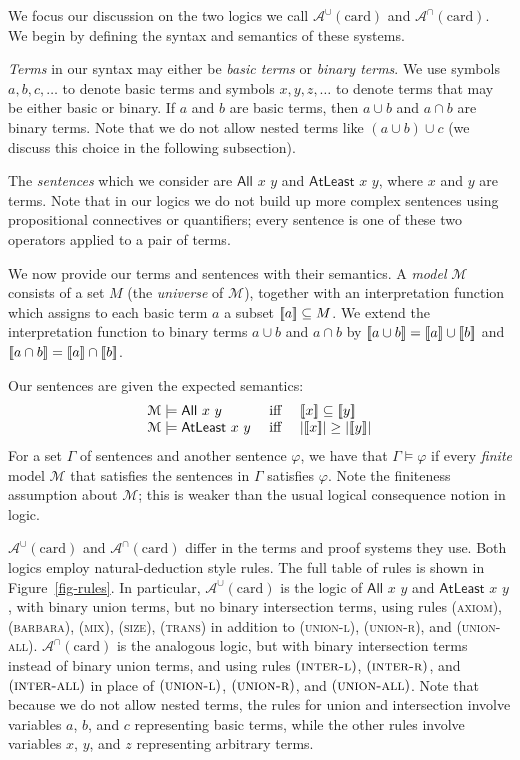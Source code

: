 \documentclass[letterpaper]{article} %
\theoremstyle{definition}
\newcommand{\semantics}[1]{[\![\mbox{\em $ #1 $\/}]\!]}
\newcommand{\Model}{\mathcal{M}}
\newcommand{\Aunion}{\mathscr{A}^{\cup}}
\newcommand{\Ainter}{\mathscr{A}^{\cap}}
\newcommand{\proverule}{\textsc}
\newcommand{\axiom}{\proverule{axiom}}
\newcommand{\barbara}{\proverule{barbara}}
\newcommand{\unionl}{\proverule{union-l}}
\newcommand{\unionr}{\proverule{union-r}}
\newcommand{\unionall}{\proverule{union-all}}
\newcommand{\interl}{\proverule{inter-l}}
\newcommand{\interr}{\proverule{inter-r}}
\newcommand{\interall}{\proverule{inter-all}}
\newcommand{\mix}{\proverule{mix}}
\newcommand{\size}{\proverule{size}}
\newcommand{\trans}{\proverule{trans}}
\newcommand{\All}[2]{\mathsf{All}\,\,#1\,\,#2}
\newcommand{\Atleast}[2]{\mathsf{AtLeast}\,\,#1\,\,#2}
\newcommand{\card}{\mathrm{card}}
\begin{document}
We focus our discussion on the two logics we call $\Aunion(\card)$ and $\Ainter(\card)$. We begin by defining the syntax and semantics of these systems.

\emph{Terms} in our syntax may either be \emph{basic terms} or \emph{binary terms}.  We use symbols $a, b, c, \ldots$ to denote basic terms and symbols $x, y, z, \ldots$ to denote terms that may be either basic or binary. If $a$ and $b$ are basic terms, then $a \cup b$ and $a \cap b$ are binary terms. Note that we do not allow nested terms like $(a\cup b)\cup c$ (we discuss this choice in the following subsection). 

The \emph{sentences} which we consider are $\All{x}{y}$ and $\Atleast{x}{y}$, where $x$ and $y$ are terms.
Note that in our logics we do not build up more complex sentences using propositional connectives or quantifiers; every sentence is one of these two operators applied to a pair of terms.

We now provide our terms and sentences with their semantics.  A \emph{model} $\mathcal{M}$ consists of a set $M$ (the \emph{universe} of $\mathcal{M}$), together with an interpretation function which assigns to each basic term $a$ a subset $\semantics{a} \subseteq M$.  We extend the interpretation function to binary terms $a \cup b$ and $a \cap b$ by $\semantics{a \cup b} = \semantics{a} \cup \semantics{b}$ and $\semantics{a \cap b} = \semantics{a} \cap \semantics{b}$.

Our sentences are given the expected semantics:
\[
\begin{array}{lclcl}
    \Model \models \All{x}{y} & \textrm{ iff } & 
        \semantics{x} \subseteq \semantics{y}\\
    \Model \models \Atleast{x}{y} & \textrm{ iff } & 
        |\semantics{x}| \ge |\semantics{y}|
\end{array}
\] 
For a set $\Gamma$ of sentences and another sentence $\varphi$, we have that $\Gamma \vDash \varphi$ if every \textit{finite} model $\mathcal{M}$ that satisfies the sentences in $\Gamma$ satisfies $\varphi$.  Note the finiteness assumption about $\mathcal{M}$; this is weaker than the usual logical consequence notion in logic. 

$\Aunion(\card)$ and $\Ainter(\card)$ differ in the terms and proof systems they use. Both logics employ natural-deduction style rules.  The full table of rules is shown in Figure~\ref{fig-rules}.  In particular, $\Aunion(\card)$ is the logic of $\All{x}{y}$ and $\Atleast{x}{y}$, with binary union terms, but no binary intersection terms, using rules (\axiom), (\barbara), (\mix), (\size), (\trans) in addition to (\unionl), (\unionr), and (\unionall).
$\Ainter(\card)$ is the analogous logic, but with binary intersection terms instead of binary union terms, and using rules $(\interl)$, $(\interr)$, and $(\interall)$ in place of $(\unionl)$, $(\unionr)$, and $(\unionall)$. Note that because we do not allow nested terms, the rules for union and intersection involve variables $a$, $b$, and $c$ representing basic terms, while the other rules involve variables $x$, $y$, and $z$ representing arbitrary terms. 
\end{document}
